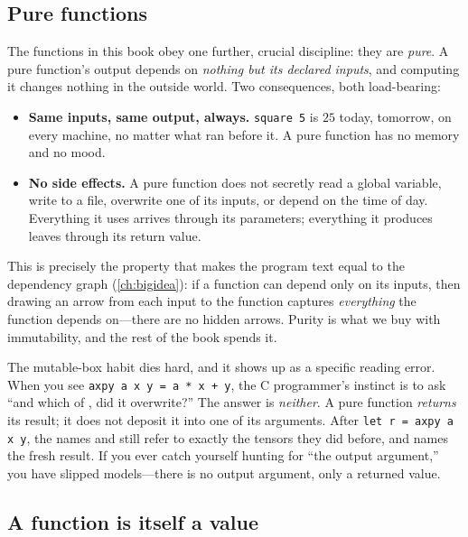 \subsection{Pure functions}

The functions in this book obey one further, crucial discipline: they are
\emph{pure}. A pure function's output depends on \emph{nothing but its declared
inputs}, and computing it changes nothing in the outside world. Two consequences,
both load-bearing:

\begin{itemize}[nosep]
  \item \textbf{Same inputs, same output, always.} \lstinline[style=l4style]|square 5|
  is $25$ today, tomorrow, on every machine, no matter what ran before it. A pure
  function has no memory and no mood.
  \item \textbf{No side effects.} A pure function does not secretly read a global
  variable, write to a file, overwrite one of its inputs, or depend on the time
  of day. Everything it uses arrives through its parameters; everything it
  produces leaves through its return value.
\end{itemize}

This is precisely the property that makes the program text equal to the
dependency graph (\cref{ch:bigidea}): if a function can depend only on its
inputs, then drawing an arrow from each input to the function captures
\emph{everything} the function depends on---there are no hidden arrows. Purity is
what we buy with immutability, and the rest of the book spends it.

\begin{pitfall}
The mutable-box habit dies hard, and it shows up as a specific reading error.
When you see \lstinline[style=l4style]|axpy a x y = a * x + y|, the C programmer's
instinct is to ask ``and which of ,  did it overwrite?'' The
answer is \emph{neither}. A pure function \emph{returns} its result; it does not
deposit it into one of its arguments. After \lstinline[style=l4style]|let r = axpy a x y|,
the names  and  still refer to exactly the tensors they did
before, and  names the fresh result. If you ever catch yourself hunting
for ``the output argument,'' you have slipped models---there is no output
argument, only a returned value.
\end{pitfall}

\subsection{A function is itself a value}

